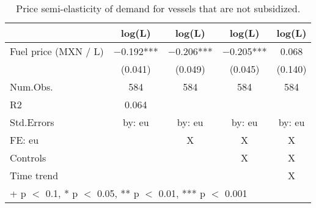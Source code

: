 \begin{table}

\caption{\label{tab:}Price semi-elasticity of demand for vessels that are not subsidized.}
\centering
\begin{tabular}[t]{lcccc}
\toprule
  & log(L) & log(L)  & log(L)   & log(L)   \\
\midrule
Fuel price (MXN / L) & \num{-0.192}*** & \num{-0.206}*** & \num{-0.205}*** & \num{0.068}\\
 & (\num{0.041}) & (\num{0.049}) & (\num{0.045}) & (\num{0.140})\\
\midrule
Num.Obs. & \num{584} & \num{584} & \num{584} & \num{584}\\
R2 & \num{0.064} &  &  & \\
Std.Errors & by: eu & by: eu & by: eu & by: eu\\
FE: eu &  & X & X & X\\
Controls &  &  & X & X\\
Time trend &  &  &  & X\\
\bottomrule
\multicolumn{5}{l}{\rule{0pt}{1em}+ p $<$ 0.1, * p $<$ 0.05, ** p $<$ 0.01, *** p $<$ 0.001}\\
\end{tabular}
\end{table}
